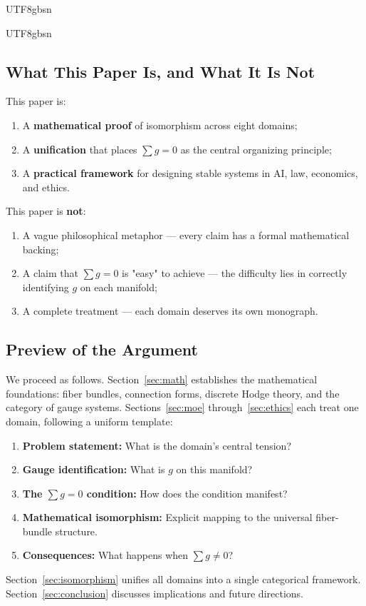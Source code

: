 \documentclass[11pt,a4paper]{article}
\begin{document}
\begin{CJK}{UTF8}{gbsn}
{\begin{CJK}{UTF8}{gbsn}
\subsection{What This Paper Is, and What It Is Not}
This paper is:
\begin{enumerate}[label=(\arabic*)]
    \item A \textbf{mathematical proof} of isomorphism across eight domains;
    \item A \textbf{unification} that places $\sum g = 0$ as the central organizing principle;
    \item A \textbf{practical framework} for designing stable systems in AI, law, economics, and ethics.
\end{enumerate}
This paper is \textbf{not}:
\begin{enumerate}[label=(\arabic*)]
    \item A vague philosophical metaphor --- every claim has a formal mathematical backing;
    \item A claim that $\sum g = 0$ is "easy" to achieve --- the difficulty lies in correctly
          identifying $g$ on each manifold;
    \item A complete treatment --- each domain deserves its own monograph.
\end{enumerate}
\subsection{Preview of the Argument}
We proceed as follows. Section~\ref{sec:math} establishes the mathematical foundations:
fiber bundles, connection forms, discrete Hodge theory, and the category of gauge systems.
Sections~\ref{sec:moe} through~\ref{sec:ethics} each treat one domain, following a uniform
template:
\begin{enumerate}[label=(\alph*)]
    \item \textbf{Problem statement:} What is the domain's central tension?
    \item \textbf{Gauge identification:} What is $g$ on this manifold?
    \item \textbf{The $\sum g = 0$ condition:} How does the condition manifest?
    \item \textbf{Mathematical isomorphism:} Explicit mapping to the universal fiber-bundle structure.
    \item \textbf{Consequences:} What happens when $\sum g \neq 0$?
\end{enumerate}
Section~\ref{sec:isomorphism} unifies all domains into a single categorical framework.
Section~\ref{sec:conclusion} discusses implications and future directions.
\end{CJK}
}
\end{CJK}
\end{document}
